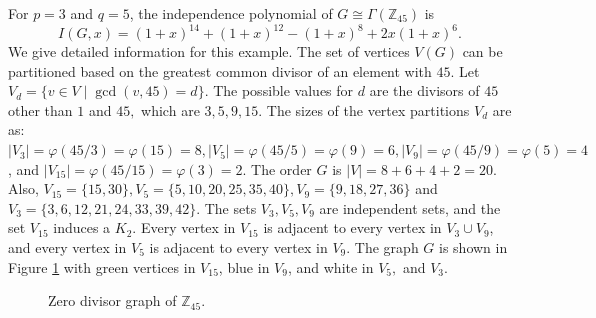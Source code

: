 \documentclass[12pt,twoside]{article}
\begin{document}
For $p=3$ and $q=5$, the independence polynomial of $G\cong \varGamma(\mathbb{Z}_{45})$ is
$$I(G, x) = (1+x)^{14} + (1+x)^{12} - (1+x)^8 + 2x(1+x)^6.$$
We give detailed information for this example. The set of vertices $V(G)$ can be partitioned based on the greatest common divisor of an element with $45.$ Let $V_d = \{v \in V \mid \gcd(v, 45) = d\}$. The possible values for $d$ are the divisors of $45$ other than $1$ and $45,$ which are $3, 5, 9, 15.$ The sizes of the vertex partitions $V_{d}$ are as: $|V_3| = \varphi(45/3) = \varphi(15) = 8, |V_5| = \varphi(45/5) = \varphi(9) = 6, |V_9| = \varphi(45/9) = \varphi(5) = 4$, and  $|V_{15}| = \varphi(45/15) = \varphi(3) = 2$.
The order $G$ is $|V| = 8+6+4+2=20$.  Also, $V_{15}=\{15,30\}, V_{5}=\{5,10,20,25,35,40\},V_{9}=\{9,18,27,36\}$ and $V_{3}=\{3,6,12,21,24,33,39,42\}.$
The sets $V_3, V_5, V_9$ are independent sets, and the set $V_{15}$ induces a $K_2$. Every vertex in $V_{15}$ is adjacent to every vertex in $V_3 \cup V_9$, and every vertex in $V_{5}$ is adjacent to every vertex in $V_{9}.$ The graph $G$ is shown in Figure \ref{zero divisor graph z36} with green vertices in $V_{15}$, blue in $V_{9}$, and white in  $V_{5}, $ and $V_{3}$. 
\begin{figure}[H]
\centering
	\caption{Zero divisor graph of $\mathbb{Z}_{45}.$}
	\label{zero divisor graph z36}
\end{figure}
\end{document}
